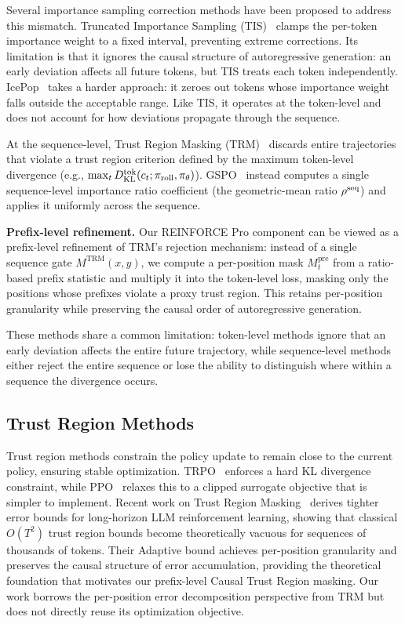 Several importance sampling correction methods have been proposed to address this mismatch. Truncated Importance Sampling (TIS)~\citep{yao2025offpolicy} clamps the per-token importance weight to a fixed interval, preventing extreme corrections. Its limitation is that it ignores the causal structure of autoregressive generation: an early deviation affects all future tokens, but TIS treats each token independently. IcePop~\citep{zhang2025icepop} takes a harder approach: it zeroes out tokens whose importance weight falls outside the acceptable range. Like TIS, it operates at the token-level and does not account for how deviations propagate through the sequence.

At the sequence-level, Trust Region Masking (TRM)~\citep{li2025trm} discards entire trajectories that violate a trust region criterion defined
by the maximum token-level divergence (e.g., $\max_t D_{\mathrm{KL}}^{\mathrm{tok}}(c_t;\pi_{\mathrm{roll}},\pi_{\theta})$). GSPO~\citep{gspo2025} instead computes a single
sequence-level importance ratio coefficient (the geometric-mean ratio $\rho^{\mathrm{seq}}$) and applies it uniformly across the sequence.
\par
\noindent\textbf{Prefix-level refinement.} Our REINFORCE Pro component can be viewed as a prefix-level refinement of TRM's rejection
mechanism: instead of a single sequence gate $M^{\mathrm{TRM}}(x,y)$, we compute a per-position mask $M_t^{\mathrm{pre}}$ from a ratio-based prefix
statistic and multiply it into the token-level loss, masking only the positions whose prefixes violate a proxy trust region. This retains
per-position granularity while preserving the causal order of autoregressive generation.

These methods share a common limitation: token-level methods ignore that an early deviation affects the entire future trajectory, while
sequence-level methods either reject the entire sequence or lose the ability to distinguish where within a sequence the divergence occurs.

\subsection{Trust Region Methods}

Trust region methods constrain the policy update to remain close to the current policy, ensuring stable optimization. TRPO~\citep{schulman2015trust} enforces a hard KL divergence constraint, while PPO~\citep{schulman2017proximal} relaxes this to a clipped surrogate objective that is simpler to implement. Recent work on Trust Region Masking~\citep{li2025trm} derives tighter error bounds for long-horizon LLM reinforcement learning, showing that classical $O(T^2)$ trust region bounds become theoretically vacuous for sequences of thousands of tokens. Their Adaptive bound achieves per-position granularity and preserves the causal structure of error accumulation, providing the theoretical foundation that motivates our prefix-level Causal Trust Region masking. Our work borrows the per-position error decomposition perspective from TRM but does not directly reuse its optimization objective.

